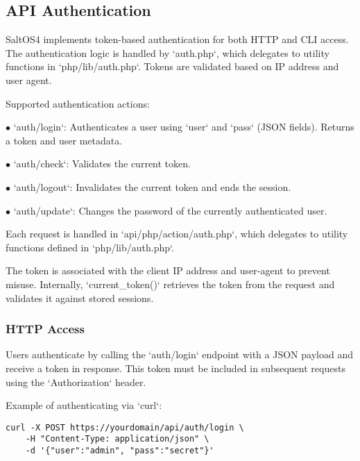\documentclass[a4paper]{article}
\begin{document}
\hypertarget{toc15}{}
\subsection{API Authentication}

SaltOS4 implements token-based authentication for both HTTP and CLI access. The authentication logic is handled by `auth.php`, which delegates to utility functions in `php/lib/auth.php`. Tokens are validated based on IP address and user agent.

Supported authentication actions:

\begin{compactitem}
\item[\color{myblue}$\bullet$] `auth/login`: Authenticates a user using `user` and `pass` (JSON fields). Returns a token and user metadata.
\item[\color{myblue}$\bullet$] `auth/check`: Validates the current token.
\item[\color{myblue}$\bullet$] `auth/logout`: Invalidates the current token and ends the session.
\item[\color{myblue}$\bullet$] `auth/update`: Changes the password of the currently authenticated user.
\end{compactitem}

Each request is handled in `api/php/action/auth.php`, which delegates to utility functions defined in `php/lib/auth.php`.

The token is associated with the client IP address and user-agent to prevent misuse. Internally, `current\_token()` retrieves the token from the request and validates it against stored sessions.

\hypertarget{toc16}{}
\subsubsection{HTTP Access}

Users authenticate by calling the `auth/login` endpoint with a JSON payload and receive a token in response. This token must be included in subsequent requests using the `Authorization` header.

Example of authenticating via `curl`:

\begin{lstlisting}
curl -X POST https://yourdomain/api/auth/login \
    -H "Content-Type: application/json" \
    -d '{"user":"admin", "pass":"secret"}'
\end{lstlisting}
\end{document}
